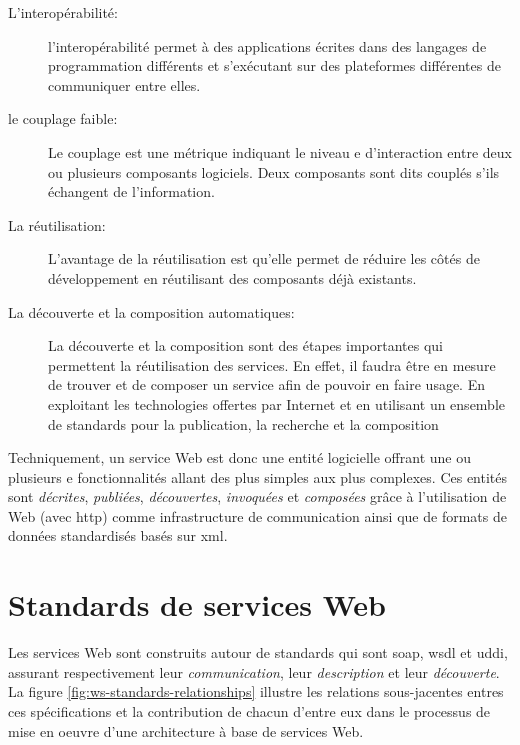   \renewcommand{\descriptionlabel}[1]{\hspace{0.5cm}\textbullet~\textsf{#1}}
  \begin{description}
  \item [L'interopérabilité:] l'interopérabilité permet à des
    applications écrites dans des langages de programmation différents
    et s'exécutant sur des plateformes différentes de communiquer
    entre elles.

  \item [le couplage faible:] Le couplage est une métrique indiquant
    le niveau e d'interaction entre deux ou plusieurs composants
    logiciels. Deux composants sont dits couplés s'ils échangent de
    l'information.

  \item [La réutilisation:] L'avantage de la réutilisation est qu'elle
    permet de réduire les  côtés de développement en réutilisant
    des composants déjà existants.

  \item [La découverte et la composition automatiques:] La découverte
    et la composition sont des étapes importantes qui permettent la
    réutilisation des services. En effet, il faudra être en mesure de
    trouver et de composer un service afin de pouvoir en faire
    usage. En exploitant les technologies offertes par Internet et en
    utilisant un ensemble de standards pour la publication, la
    recherche et la composition
  \end{description}
  \enddescription


  Techniquement, un service Web est donc une entité logicielle offrant
  une ou plusieurs e fonctionnalités allant des plus simples aux plus
  complexes. Ces entités sont \emph{décrites}, \emph{publiées},
  \emph{découvertes}, \emph{invoquées} et \emph{composées} grâce à
  l'utilisation de Web (avec \acrshort{http}) comme infrastructure de
  communication ainsi que de formats de données standardisés basés sur
  \acrshort{xml}.


\section{Standards de services Web}
\label{sec:reference-arch}
Les services Web sont construits autour de standards qui sont
\acrshort{soap}, \acrshort{wsdl} et \acrshort{uddi}, assurant
respectivement leur \emph{communication}, leur \emph{description} et
leur \emph{découverte}. La figure \ref{fig:ws-standards-relationships}
illustre les relations sous-jacentes entres ces spécifications et la
contribution de chacun d'entre eux dans le processus de mise en oeuvre
d'une architecture à base de services Web.

